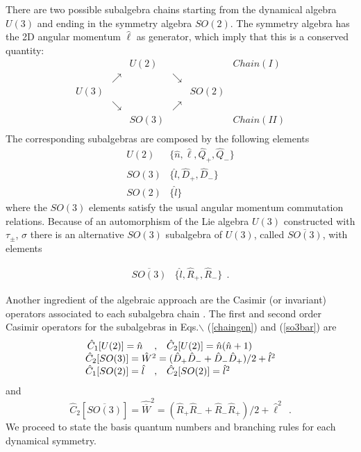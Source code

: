 \documentclass[a4paper,12pt,captions=tableheading]{article}
\begin{document}
There are two possible subalgebra chains starting from the dynamical
algebra \(U(3)\) and ending in the symmetry algebra \(SO(2)\). The
symmetry algebra has the 2D angular momentum \(\hat \ell\) as
generator, which imply that this is a conserved quantity:
\begin{equation}
\begin{array}{cccccl}
     &         &U(2) &          & &Chain (I)\\
     & \nearrow&     & \searrow & &\\
U(3) &         &     &          & SO(2)&\\
     & \searrow&     & \nearrow & &\\
     &         &SO(3)&          & &Chain(II)\\
\end{array}
\end{equation}
The corresponding  subalgebras are composed by the following elements
\begin{equation}
\begin{array}{cc}
U(2)  &\{\hat n, \hat \ell, \hat Q_+, \hat Q_-\}\\
SO(3) &\{\hat l, \hat D_+, \hat D_-\}\\ 
SO(2) &\{\hat l\}
\end{array}
\label{chaingen}
\end{equation}
\noindent where the $SO(3)$ elements satisfy the usual angular momentum
commutation relations. Because of an automorphism of the Lie algebra
$U(3)$ constructed with $\tau_\pm$, $\sigma$ there is an alternative
$SO(3)$ subalgebra of $U(3)$, called $\overline{SO(3)}$, with elements

\begin{equation}
\begin{array}{cr}
\overline{SO(3)} &\{\hat l, \hat R_+, \hat R_-\} ~~.
\end{array}
\label{so3bar}
\end{equation}

Another ingredient of the algebraic approach are the Casimir (or
invariant) operators associated to each subalgebra chain
\cite{frank, bookalg}. The first and second order Casimir operators for
the subalgebras in Eqs.$\backslash$ (\ref{chaingen}) and (\ref{so3bar}) are 
\begin{equation}
\begin{array}{ccl}
\hat C_1[U(2)]=\hat n&,&\hat C_2[U(2)]= \hat n(\hat n+1)\\
\multicolumn{3}{c}{\hat C_2[SO(3)] = \hat W^2 =(\hat D_+\hat D_-+\hat D_-\hat
D_+)/2+\hat l^2} \\ 
\hat C_1[SO(2)]=\hat l &,&\hat C_2[SO(2)]=\hat l^2\\
\end{array}
\label{casimir}
\end{equation}
\noindent and 
\begin{equation}
\hat C_2[\overline{SO(3)}] = \hat {\overline{W}}^2 = (\hat R_+\hat R_-+\hat R_-\hat
R_+)/2+\hat \ell^2~~.
\label{casimirbar}
\end{equation}
We proceed to state the basis quantum numbers and branching rules for each  dynamical symmetry.
\end{document}
